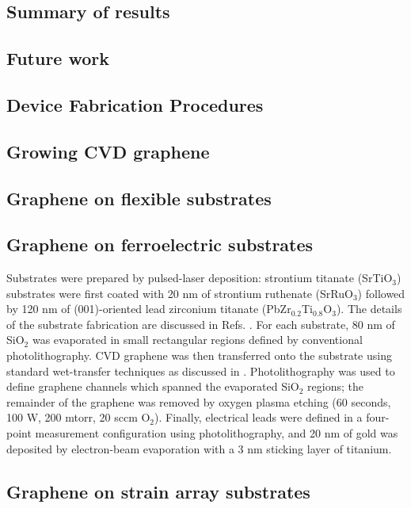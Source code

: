 \documentclass[edeposit,fullpage,draftthesis]{uiucthesis2009}
\begin{document}
\section{Summary of results}
\section{Future work}

\begin{appendices}

\chapter{Device Fabrication Procedures}
\label{appendix:fab}
\section{Growing CVD graphene}
\section{Graphene on flexible substrates}
\section{Graphene on ferroelectric substrates}

Substrates were prepared by pulsed-laser deposition: strontium titanate (SrTiO$_3$) substrates were first coated with 20 nm of strontium ruthenate (SrRuO$_3$) followed by 120 nm of (001)-oriented lead zirconium titanate (PbZr$_{0.2}$Ti$_{0.8}$O$_3$). The details of the substrate fabrication are discussed in Refs. 
\cite{Xu2014,Karthik2012}.
For each substrate, 80 nm of SiO$_2$ was evaporated in small rectangular regions defined by conventional photolithography. CVD graphene was then transferred onto the substrate using standard wet-transfer techniques as discussed in \cite{Li2009}.
Photolithography was used to define graphene channels which spanned the evaporated SiO$_2$ regions; 
the remainder of the graphene was removed by oxygen plasma etching (60 seconds, 100 W, 200 mtorr, 20 sccm O$_2$). 
Finally, electrical leads were defined in a four-point measurement configuration using photolithography, and 20 nm of gold was deposited by electron-beam evaporation with a 3 nm sticking layer of titanium.

\section{Graphene on strain array substrates}


\end{appendices}
\end{document}
